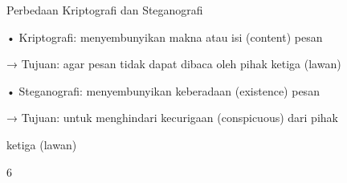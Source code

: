 \documentclass{article}
\begin{document}

Perbedaan Kriptografi dan Steganografi

• Kriptografi: menyembunyikan makna atau isi (content) pesan

 → Tujuan: agar pesan tidak dapat dibaca oleh pihak ketiga (lawan)

• Steganografi: menyembunyikan keberadaan (existence) pesan

 → Tujuan: untuk menghindari kecurigaan (conspicuous)  dari pihak 

ketiga (lawan) 

6
\end{document}
